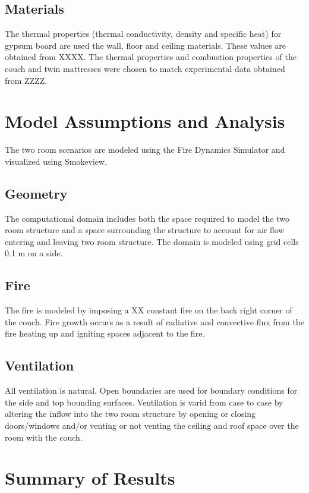 \documentclass[11pt]{book}
\begin{document}
\subsection{Materials}
The thermal properties (thermal conductivity, density and specific heat) for gypsum board are used the wall, floor and ceiling materials.  These values are obtained from XXXX.  The thermal properties and combustion properties of the couch and twin mattresses were chosen to match experimental data obtained from ZZZZ.


\section{Model Assumptions and Analysis}
The two room scenarios are modeled using the Fire Dynamics Simulator and
visualized using Smokeview.

\subsection{Geometry}
The computational domain includes both the space required to model the two room 
structure and a space surrounding the structure to account for air flow entering and leaving two room structure.  The domain is modeled using grid cells 0.1 m on a side.


\subsection{Fire}
The fire is modeled by imposing a XX constant fire on the back right corner of the
couch.  Fire growth occurs as a result of radiative and convective flux from the fire heating up and igniting spaces adjacent to the fire.

\subsection{Ventilation}
All ventilation is natural.  Open boundaries are used for boundary conditions for the side and top bounding surfaces.  Ventilation is varid from case to case by altering the inflow into the two room structure by opening or closing doors/windows and/or
venting or not venting the ceiling and roof space over the room with the couch. 


\section{Summary of Results}
\end{document}
